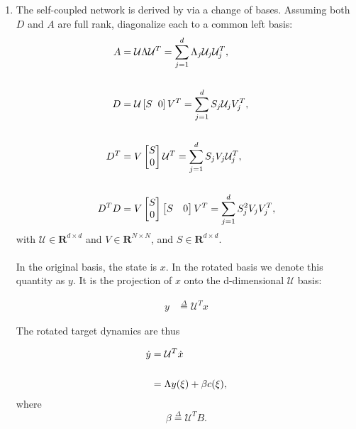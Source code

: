 \begin{enumerate}
\clearpage

\item The self-coupled network is derived by via a change of bases. Assuming both $D$ and $A$ are full rank, diagonalize each to a common left basis:
\begin{align*}
    A &= \mathcal{U} \Lambda \mathcal{U}^T = \sum_{j=1}^d \Lambda_j \mathcal{U}_j \mathcal{U}_j^T,\\
    \\
    D &= \mathcal{U} \left[S \hspace{2mm} 0 \right]  V^T = \sum_{j=1}^d S_j \mathcal{U}_j  V_j^T,\\
    \\
    D^T &= V \begin{bmatrix} S \\ 0\end{bmatrix} \mathcal{U}^T = \sum_{j=1}^d S_j V_j  \mathcal{U}_j^T, \\
    \\
    D^T D  &= V \begin{bmatrix} S \\ 0\end{bmatrix} \begin{bmatrix} S & 0\end{bmatrix} V^T
     = \sum_{j=1}^d S_j^2 V_j V_j^T , 
\end{align*}
with $\mathcal{U} \in \mathbf{R}^{d \times d}$ and $V \in \mathbf{R}^{N \times N}$, and $S \in \mathbf{R}^{d \times d }$. \\
\\

In the original basis, the state is $x$. In the rotated basis we denote this quantity as $y$. It is the projection of $x$ onto the d-dimensional $\mathcal{U}$ basis:

\begin{align}
\label{eq:definition_rotated_state_space}
y &\overset{\Delta}{=} \mathcal{U}^T x 
\end{align}

The rotated target dynamics are thus

\begin{align}
\label{eq:rotated_targed_dynamical_system}
\dot{y} &= \mathcal{U}^T \dot{x} \notag
\\
\\ \notag
&= 
\Lambda y (\xi)
+
\beta c(\xi),
\end{align}
where  
$$
\beta \overset{\Delta}{=} \mathcal{U}^T B. 
$$


\end{enumerate}

